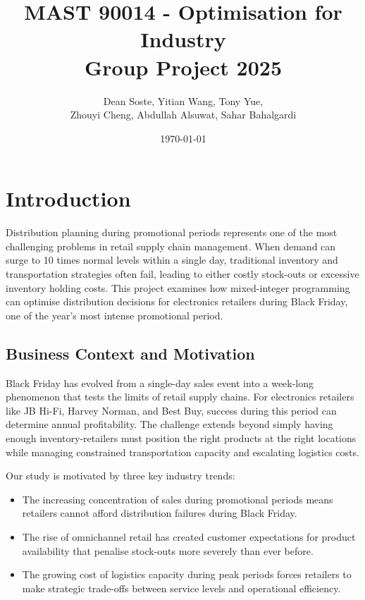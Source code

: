 \documentclass[a4paper,12pt]{article}
\title{MAST 90014 - Optimisation for Industry \\ Group Project 2025}
\author{{Dean Soste}, {Yitian Wang}, {Tony Yue}, \\
{Zhouyi Cheng}, {Abdullah Alsuwat}, {Sahar Bahalgardi}
}
\date{\today}
\begin{document}
\maketitle




\section{Introduction}\label{sec:introduction}

Distribution planning during promotional periods represents one of the most challenging problems in retail supply chain management.
When demand can surge to 10 times normal levels within a single day, traditional inventory and transportation strategies often fail, leading to either costly stock-outs or excessive inventory holding costs.
This project examines how mixed-integer programming can optimise distribution decisions for electronics retailers during Black Friday, one of the year's most intense promotional period.

\subsection{Business Context and Motivation}\label{subsec:business-context-and-motivation}

Black Friday has evolved from a single-day sales event into a week-long phenomenon that tests the limits of retail supply chains.
For electronics retailers like JB Hi-Fi, Harvey Norman, and Best Buy, success during this period can determine annual profitability.
The challenge extends beyond simply having enough inventory-retailers must position the right products at the right locations while managing constrained transportation capacity and escalating logistics costs.

Our study is motivated by three key industry trends:
\begin{itemize}
    \item The increasing concentration of sales during promotional periods means retailers cannot afford distribution failures during Black Friday.
    \item The rise of omnichannel retail has created customer expectations for product availability that penalise stock-outs more severely than ever before.
    \item The growing cost of logistics capacity during peak periods forces retailers to make strategic trade-offs between service levels and operational efficiency.
\end{itemize}
\end{document}
